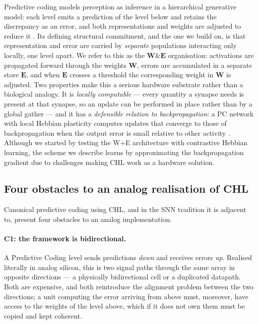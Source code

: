 \documentclass[11pt]{article}
\begin{document}
Predictive coding models perception as inference in a hierarchical
generative model: each level emits a prediction of the level below and
retains the discrepancy as an error, and both representations and
weights are adjusted to reduce it
\cite{rao1999predictive, bogacz2017tutorial}. Its defining structural
commitment, and the one we build on, is that representation and error
are carried by \emph{separate} populations interacting only locally, one
level apart. We refer to this as the \(\bm W\&\bm E\) organisation:
activations are propagated forward through the weights \(\bm W\), errors
are accumulated in a separate store \(\bm E\), and when \(\bm E\)
crosses a threshold the corresponding weight in \(\bm W\) is adjusted.
Two properties make this a serious hardware substrate rather than a
biological analogy. It is \emph{locally computable} --- every quantity a
synapse needs is present at that synapse, so an update can be performed
in place rather than by a global gather --- and it has a
\emph{defensible relation to backpropagation}: a PC network with local
Hebbian plasticity computes updates that converge to those of
backpropagation when the output error is small relative to other
activity \cite{whittington2017approximation}. Although we started by
testing the W+E architecture with contrastive Hebbian learning, the
scheme we describe learns by approximating the backpropagation gradient
due to challenges making CHL work as a hardware solution.

\hypertarget{sec:pc-challenges}{%
\subsection{Four obstacles to an analog realisation of
CHL}\label{sec:pc-challenges}}

Canonical predictive coding using CHL, and in the SNN tradition it is
adjacent to, present four obstacles to an analog implementation.

\hypertarget{c1-the-framework-is-bidirectional.}{%
\paragraph{C1: the framework is
bidirectional.}\label{c1-the-framework-is-bidirectional.}}

A Predictive Coding level sends predictions \emph{down} and receives
errors \emph{up}. Realised literally in analog silicon, this is two
signal paths through the same array in opposite directions --- a
physically bidirectional cell or a duplicated datapath. Both are
expensive, and both reintroduce the alignment problem between the two
directions; a unit computing the error arriving from above must,
moreover, have access to the weights of the level above, which if it
does not own them must be copied and kept coherent.
\end{document}
